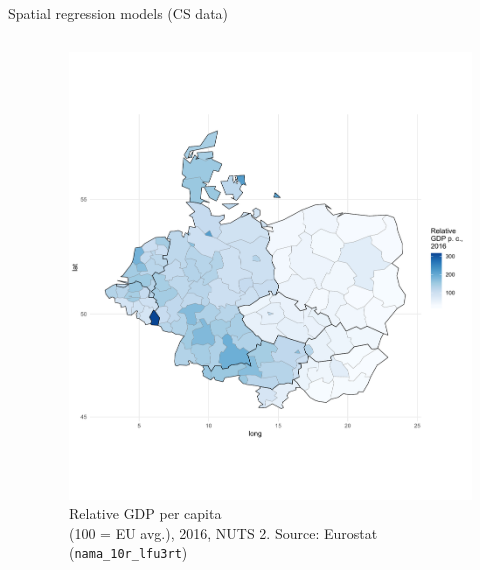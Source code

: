 \documentclass{beamer}
\begin{document}
\begin{frame}{Spatial regression models (CS data)}
\begin{columns}[T]
\begin{column}{.48\textwidth}
\end{column}%
\begin{column}{.48\textwidth}
\vspace{-0.1cm}
\begin{figure}
  \centering
  \includegraphics[trim=0cm 3cm 1cm 2cm, clip=true, width=1\textwidth]{IMG/sp_GDP_Choropleth.pdf}\vspace{-0.4cm}\tiny{{\caption{Relative GDP per capita \\ (100 = EU avg.), 2016, NUTS 2. Source: Eurostat (\texttt{nama\_10r\_lfu3rt})}}}
\end{figure}
\end{column}
\end{columns}
\end{frame}
\end{document}
